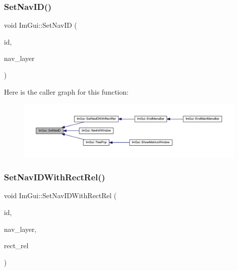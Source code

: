 \subsubsection{\texorpdfstring{Set\+Nav\+I\+D()}{SetNavID()}}
{\footnotesize\ttfamily void Im\+Gui\+::\+Set\+Nav\+ID (\begin{DoxyParamCaption}\item[{\mbox{\hyperlink{imgui_8h_a1785c9b6f4e16406764a85f32582236f}{Im\+Gui\+ID}}}]{id,  }\item[{int}]{nav\+\_\+layer }\end{DoxyParamCaption})}

Here is the caller graph for this function\+:
\nopagebreak
\begin{figure}[H]
\begin{center}
\leavevmode
\includegraphics[width=350pt]{namespace_im_gui_acb36abbe2ac25534eed9fc73f8c6adef_icgraph}
\end{center}
\end{figure}
\mbox{\label{namespace_im_gui_a91892871e19fba553a0f81e2cc49b0d3}} 
\subsubsection{\texorpdfstring{Set\+Nav\+I\+D\+With\+Rect\+Rel()}{SetNavIDWithRectRel()}}
{\footnotesize\ttfamily void Im\+Gui\+::\+Set\+Nav\+I\+D\+With\+Rect\+Rel (\begin{DoxyParamCaption}\item[{\mbox{\hyperlink{imgui_8h_a1785c9b6f4e16406764a85f32582236f}{Im\+Gui\+ID}}}]{id,  }\item[{int}]{nav\+\_\+layer,  }\item[{const \mbox{\hyperlink{struct_im_rect}{Im\+Rect}} \&}]{rect\+\_\+rel }\end{DoxyParamCaption})}

